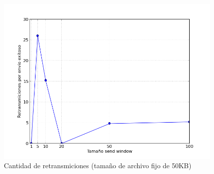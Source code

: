 
\begin{figure}[H]
\begin{center}
\includegraphics[width=\textwidth,keepaspectratio]{retransmiciones50.png}
\end{center}
\caption{Cantidad de retransmiciones (tamaño de archivo fijo de 50KB)} \label{figura6}
\end{figure}

